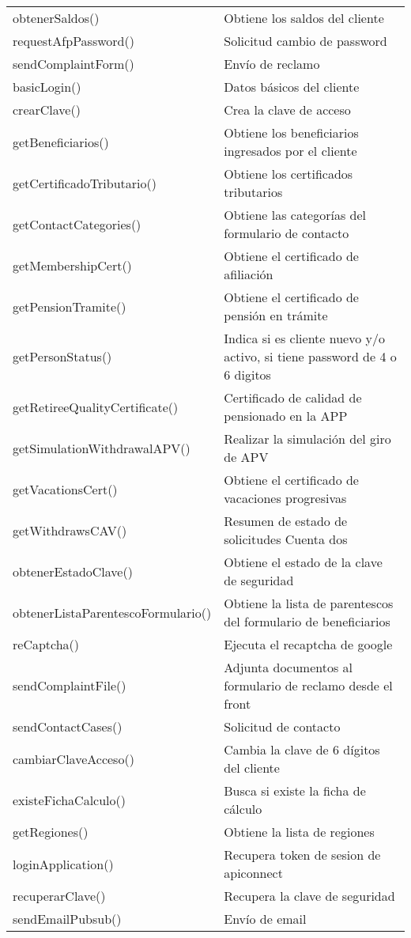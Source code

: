 \begin{tabular}{|p{6cm}|p{8cm}|}
    obtenerSaldos() &	Obtiene los saldos del cliente \\
    requestAfpPassword() &	Solicitud cambio de password \\
    sendComplaintForm() &	Envío de reclamo \\
    basicLogin() &	Datos básicos del cliente \\
    crearClave() &	Crea la clave de acceso \\
    getBeneficiarios() &	Obtiene los beneficiarios ingresados por el cliente \\
    getCertificadoTributario() &	Obtiene los certificados tributarios \\
    getContactCategories() &	Obtiene las categorías del formulario de contacto \\
    getMembershipCert() &	Obtiene el certificado de afiliación \\
    getPensionTramite() &	Obtiene el certificado de pensión en trámite \\
    getPersonStatus() &	Indica si es cliente nuevo y/o activo, si tiene password de 4 o 6 digitos \\
    getRetireeQualityCertificate() &	Certificado de calidad de pensionado en la APP \\
    getSimulationWithdrawalAPV() &	Realizar la simulación del giro de APV \\
    getVacationsCert() &	Obtiene el certificado de vacaciones progresivas \\
    getWithdrawsCAV() &	Resumen de estado de solicitudes Cuenta dos \\
    obtenerEstadoClave() &	Obtiene el estado de la clave de seguridad \\
    obtenerListaParentescoFormulario() &	Obtiene la lista de parentescos del formulario de beneficiarios \\
    reCaptcha() &	Ejecuta el recaptcha de google \\
    sendComplaintFile() &	Adjunta documentos al formulario de reclamo desde el front \\
    sendContactCases() &	Solicitud de contacto \\
    cambiarClaveAcceso() &	Cambia la clave de 6 dígitos del cliente \\
    existeFichaCalculo() &	Busca si existe la ficha de cálculo \\
    getRegiones() &	Obtiene la lista de regiones \\
    loginApplication() &	Recupera token de sesion de apiconnect \\
    recuperarClave() &	Recupera la clave de seguridad \\
    sendEmailPubsub() &	Envío de email \\    
    \hline
\end{tabular}